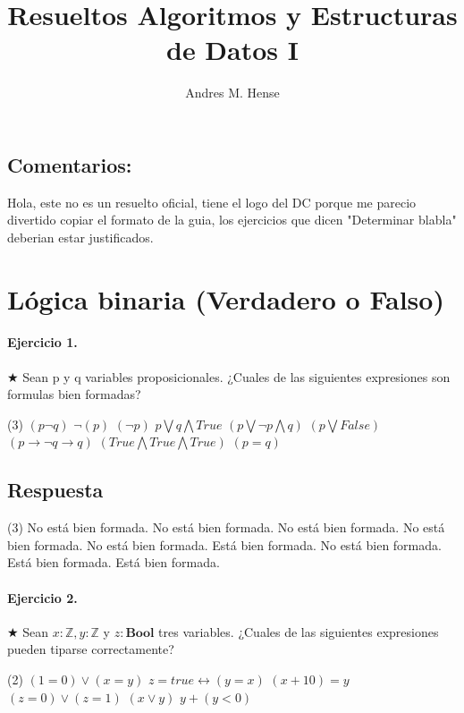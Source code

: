 \documentclass[a4paper]{article}
\title{Resueltos Algoritmos y Estructuras de Datos I}
\author{Andres M. Hense}
\begin{document}

\subsection*{Comentarios:}
Hola, este no es un resuelto oficial, tiene el logo del DC porque me parecio divertido copiar el formato de la guia, los ejercicios que dicen "Determinar blabla" deberian estar justificados.

\section{Lógica binaria (Verdadero o Falso)}

\paragraph{\textbf{Ejercicio 1.}} $\bigstar$ Sean p y q variables proposicionales. ¿Cuales de las siguientes expresiones son formulas bien formadas?

\begin{tasks}(3)
	\task $ (p \neg q) $
	\task[d)] $ \neg (p) $
	\task[g)] $ ( \neg p) $	
	\task $ p \bigvee q \bigwedge True $
	\task[e)] $ (p \bigvee \neg p \bigwedge q) $
	\task[h)] $ (p \bigvee False) $
	\task $ (p \rightarrow \neg q \rightarrow q) $		
	\task[f)] $ (True \bigwedge True \bigwedge True) $	
	\task[i)] $ (p=q) $ 
\end{tasks}

\subsection*{Respuesta}

\begin{tasks}(3)
	\task No está bien formada.
	\task[d)] No está bien formada.
	\task[g)] No está bien formada.
	\task No está bien formada.
	\task[e)] No está bien formada.
	\task[h)] Está bien formada.
	\task No está bien formada.
	\task[f)] Está bien formada.
	\task[i)] Está bien formada.
\end{tasks}

\paragraph{\textbf{Ejercicio 2.}} $\bigstar$  Sean $ x: \mathbb{Z} ,y: \mathbb{Z}$ y $ z: \textbf{Bool} $ tres variables. ¿Cuales de las siguientes expresiones pueden tiparse correctamente?


\begin{tasks}(2)
	\task $ (1=0) \vee (x=y) $
	\task[d)] $ z= true \leftrightarrow (y=x) $
	\task $ (x+10)=y $
	\task[e)] $ (z=0) \vee (z=1) $
	\task $ (x \vee y) $
	\task[f)] $ y + (y<0) $
\end{tasks}
\end{document}
